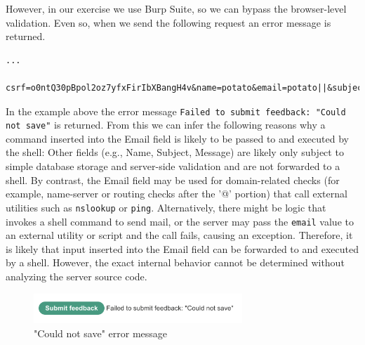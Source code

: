 \documentclass{article}
\begin{document}
\begin{description}
    However, in our exercise we use Burp Suite, so we can bypass the browser-level validation. Even so, when we send the following request an error message is returned.
    \begin{lstlisting}[label={lst:email-invalid},caption={Request where a command inserted into the Email field is rejected}]
    ...
    csrf=o0ntQ30pBpol2oz7yfxFirIbXBangH4v&name=potato&email=potato||&subject=potato&message=%E3%84%B4%E3%85%81%E3%85%87%E3%84%B4%E3%85%81%E3%85%87
    \end{lstlisting}
    In the example above the error message \texttt{Failed to submit feedback: "Could not save"} is returned. From this we can infer the following reasons why a command inserted into the Email field is likely to be passed to and executed by the shell:
    Other fields (e.g., Name, Subject, Message) are likely only subject to simple database storage and server-side validation and are not forwarded to a shell.  
    By contrast, the Email field may be used for domain-related checks (for example, name-server or routing checks after the '@' portion) that call external utilities such as \texttt{nslookup} or \texttt{ping}.  
    Alternatively, there might be logic that invokes a shell command to send mail, or the server may pass the \texttt{email} value to an external utility or script and the call fails, causing an exception.  
    Therefore, it is likely that input inserted into the Email field can be forwarded to and executed by a shell. However, the exact internal behavior cannot be determined without analyzing the server source code.

      \begin{figure}[htbp]
      \centering
      \includegraphics[width=0.7\textwidth]{../figure/figure5.png}
      \caption{"Could not save" error message}
      \label{fig:could-not-save}
      \end{figure}

\end{description}

\newpage
\end{document}
